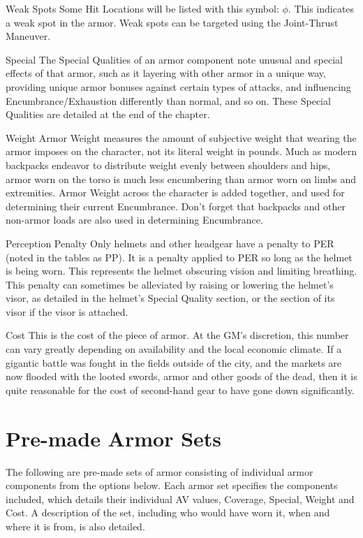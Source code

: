 \documentclass[oneside,11pt,english]{book}
\begin{document}
Weak Spots
Some Hit Locations will be listed with this symbol: $\phi$. This indicates a weak spot in the armor. Weak spots can be 
targeted using the Joint-Thrust Maneuver.

Special
The Special Qualities of an armor component note unusual and special effects of that armor, such as it layering with 
other armor in a unique way, providing unique armor bonuses against certain types of attacks, and influencing 
Encumbrance/Exhaustion differently than normal, and so on. These Special Qualities are detailed at the end of the 
chapter.

Weight
Armor Weight measures the amount of subjective weight that wearing the armor imposes on the character, not its 
literal weight in pounds. Much as modern backpacks endeavor to distribute weight evenly between shoulders and hips,
armor worn on the torso is much less encumbering than armor worn on limbs and extremities.
Armor Weight across the character is added together, and used for determining their current Encumbrance. Don’t 
forget that backpacks and other non-armor loads are also used in determining Encumbrance.

Perception Penalty
Only helmets and other headgear have a penalty to PER (noted in the tables as PP). It is a penalty applied to PER so 
long as the helmet is being worn. This represents the helmet obscuring vision and limiting breathing. This penalty can 
sometimes be alleviated by raising or lowering the helmet’s visor, as detailed in the helmet’s Special Quality section, 
or the section of its visor if the visor is attached.

Cost
This is the cost of the piece of armor. At the GM’s discretion, this number can vary greatly depending on availability 
and the local economic climate. If a gigantic battle was fought in the fields outside of the city, and the markets are 
now flooded with the looted swords, armor and other goods of the dead, then it is quite reasonable for the cost of 
second-hand gear to have gone down significantly.

\section{Pre-made Armor Sets}
The following are pre-made sets of armor consisting of individual armor components from the options below. Each 
armor set specifies the components included, which details their individual AV values, Coverage, Special, Weight and 
Cost. A description of the set, including who would have worn it, when and where it is from, is also detailed. 
\end{document}
